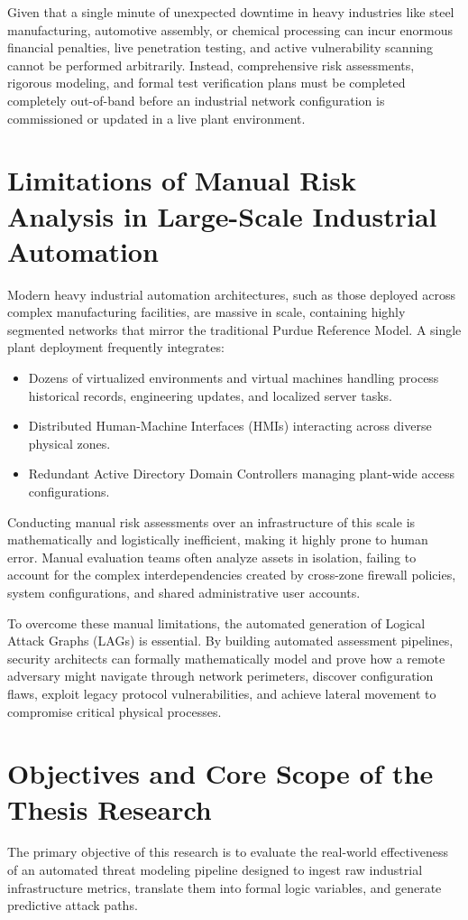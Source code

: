 \documentclass[target=mst,aauheader=aics,style=]{thud}
\begin{document}
Given that a single minute of unexpected downtime in heavy industries like steel manufacturing, automotive assembly, or chemical processing can incur enormous financial penalties, live penetration testing, and active vulnerability scanning cannot be performed arbitrarily. Instead, comprehensive risk assessments, rigorous modeling, and formal test verification plans must be completed completely out-of-band before an industrial network configuration is commissioned or updated in a live plant environment.

\section{Limitations of Manual Risk Analysis in Large-Scale Industrial Automation}
Modern heavy industrial automation architectures, such as those deployed across complex manufacturing facilities, are massive in scale, containing highly segmented networks that mirror the traditional Purdue Reference Model. A single plant deployment frequently integrates:
\begin{itemize}
    \item Dozens of virtualized environments and virtual machines handling process historical records, engineering updates, and localized server tasks.
    \item Distributed Human-Machine Interfaces (HMIs) interacting across diverse physical zones.
    \item Redundant Active Directory Domain Controllers managing plant-wide access configurations.
\end{itemize}

Conducting manual risk assessments over an infrastructure of this scale is mathematically and logistically inefficient, making it highly prone to human error. Manual evaluation teams often analyze assets in isolation, failing to account for the complex interdependencies created by cross-zone firewall policies, system configurations, and shared administrative user accounts. 

To overcome these manual limitations, the automated generation of Logical Attack Graphs (LAGs) is essential. By building automated assessment pipelines, security architects can formally mathematically model and prove how a remote adversary might navigate through network perimeters, discover configuration flaws, exploit legacy protocol vulnerabilities, and achieve lateral movement to compromise critical physical processes.

\section{Objectives and Core Scope of the Thesis Research}
The primary objective of this research is to evaluate the real-world effectiveness of an automated threat modeling pipeline designed to ingest raw industrial infrastructure metrics, translate them into formal logic variables, and generate predictive attack paths.
\end{document}
